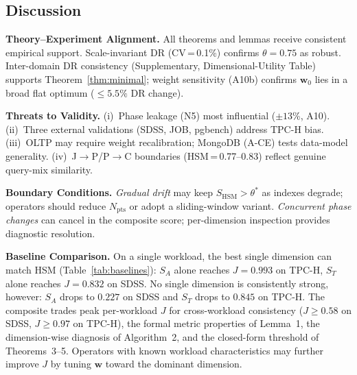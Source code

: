 \documentclass[10pt,journal,compsoc]{IEEEtran}
\newcommand{\SHSM}{S_{\mathrm{HSM}}}
\newcommand{\ST}{S_{T}}
\newcommand{\SA}{S_{A}}
\newcommand{\Npts}{N_{\mathrm{pts}}}
\newcommand{\thetastar}{\theta^{*}}
\begin{document}
\FloatBarrier
\subsection{Discussion}


\textbf{Theory--Experiment Alignment.}
All theorems and lemmas receive consistent empirical support.
Scale-invariant DR (CV\,=\,0.1\%) confirms $\theta\!=\!0.75$ as robust.
Inter-domain DR consistency (Supplementary, Dimensional-Utility Table)
supports Theorem~\ref{thm:minimal}; weight sensitivity (A10b) confirms
$\mathbf{w}_0$ lies in a broad flat optimum ($\leq5.5\%$ DR change).

\textbf{Threats to Validity.}
(i)~Phase leakage (N5) most influential ($\pm13$\%, A10).
(ii)~Three external validations (SDSS, JOB, pgbench) address TPC-H bias.
(iii)~OLTP may require weight recalibration; MongoDB (A-CE) tests data-model generality.
(iv)~J$\to$P/P$\to$C boundaries (HSM\,=\,0.77--0.83) reflect genuine query-mix similarity.

\textbf{Boundary Conditions.}
\textit{Gradual drift} may keep $\SHSM\!>\!\thetastar$ as indexes degrade;
operators should reduce $\Npts$ or adopt a sliding-window variant.
\textit{Concurrent phase changes} can cancel in the composite score;
per-dimension inspection provides diagnostic resolution.

\textbf{Baseline Comparison.}\label{sec:comparative}
On a single workload, the best single dimension can match HSM
(Table~\ref{tab:baselines}): $\SA$ alone reaches $J\!=\!0.993$ on
TPC-H, $\ST$ alone reaches $J\!=\!0.832$ on SDSS.  No single
dimension is consistently strong, however: $\SA$ drops to $0.227$
on SDSS and $\ST$ drops to $0.845$ on TPC-H.  The composite trades
peak per-workload $J$ for cross-workload consistency
($J\!\ge\!0.58$ on SDSS, $J\!\ge\!0.97$ on TPC-H), the formal
metric properties of Lemma~1, the dimension-wise diagnosis of
Algorithm~2, and the closed-form threshold of Theorems~3--5.
Operators with known workload characteristics may further improve
$J$ by tuning $\mathbf{w}$ toward the dominant dimension.
\end{document}
